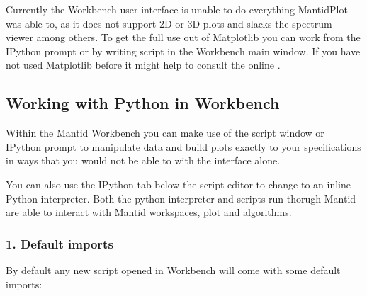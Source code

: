 \documentclass[letterpaper,10pt,english,openany]{sphinxmanual}
\let\sphinxpxdimen\pdfpxdimen\else\newdimen\sphinxpxdimen
\begin{document}
Currently the Workbench user interface is unable to do everything MantidPlot was able to, as it does not support 2D or 3D plots and slacks the spectrum viewer among others.
To get the full use out of Matplotlib you can work from the IPython prompt or by writing script in the Workbench main window. If you have not used Matplotlib before it might
help to consult the online .


\subsection{Working with Python in Workbench}
\label{\detokenize{mantid_basic_course/using_workbench/03_Working_with_Python_in_Workbench:working-with-python-in-workbench}}\label{\detokenize{mantid_basic_course/using_workbench/03_Working_with_Python_in_Workbench:id1}}\label{\detokenize{mantid_basic_course/using_workbench/03_Working_with_Python_in_Workbench::doc}}
Within the Mantid Workbench you can make use of the script window or IPython prompt to manipulate data and build plots exactly to your specifications in ways that you would not
be able to with the interface alone.

\begin{figure}[H]
\centering

\noindent\sphinxincludegraphics[width=500\sphinxpxdimen]{{Workbench_script_new}.png}
\end{figure}

You can also use the IPython tab below the script editor to change to an inline Python interpreter. Both the python interpreter and scripts run thorugh Mantid are able to interact
with Mantid workspaces, plot and algorithms.


\subsubsection{1. Default imports}
\label{\detokenize{mantid_basic_course/using_workbench/03_Working_with_Python_in_Workbench:default-imports}}
By default any new script opened in Workbench will come with some default imports:

\begin{sphinxVerbatim}[commandchars=\\\{\}]
      
\end{sphinxVerbatim}
\end{document}
